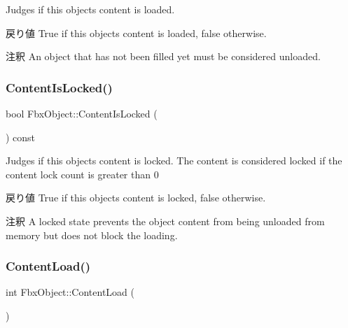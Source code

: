 Judges if this object\textquotesingle{}s content is loaded. \begin{DoxyReturn}{戻り値}
{\ttfamily True} if this object\textquotesingle{}s content is loaded, {\ttfamily false} otherwise. 
\end{DoxyReturn}
\begin{DoxyRemark}{注釈}
An object that has not been filled yet must be considered unloaded. 
\end{DoxyRemark}
\mbox{\label{class_fbx_object_ad9e3373b45e2fbce5a7a11a09edd96f7}} 
\subsubsection{\texorpdfstring{Content\+Is\+Locked()}{ContentIsLocked()}}
{\footnotesize\ttfamily bool Fbx\+Object\+::\+Content\+Is\+Locked (\begin{DoxyParamCaption}{ }\end{DoxyParamCaption}) const}

Judges if this object\textquotesingle{}s content is locked. The content is considered locked if the content lock count is greater than 0 \begin{DoxyReturn}{戻り値}
{\ttfamily True} if this object\textquotesingle{}s content is locked, {\ttfamily false} otherwise. 
\end{DoxyReturn}
\begin{DoxyRemark}{注釈}
A locked state prevents the object content from being unloaded from memory but does not block the loading. 
\end{DoxyRemark}
\mbox{\label{class_fbx_object_a296d454c59bd93245dd5e2312dc7f165}} 
\subsubsection{\texorpdfstring{Content\+Load()}{ContentLoad()}}
{\footnotesize\ttfamily int Fbx\+Object\+::\+Content\+Load (\begin{DoxyParamCaption}{ }\end{DoxyParamCaption})}

